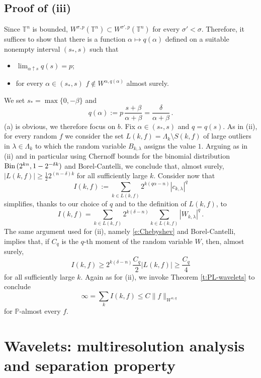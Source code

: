 \documentclass[11pt,reqno]{amsart}
\theoremstyle{definition}
\numberwithin{equation}{section}
\begin{document}
\subsection{Proof of (iii)} Since $\mathbb T^n$ is bounded, $W^{\sigma, p} (\mathbb T^n) \subset W^{\sigma', p} (\mathbb T^n)$ for every $\sigma'< \sigma$. Therefore, it suffices to show that there is a function $\alpha\mapsto q(\alpha)$ defined on a suitable nonempty interval $(s_*,s)$ such that 
\begin{itemize}
\item[(a)] $\lim_{\alpha \uparrow s} q(s) = p$;
\item[(b)] for every $\alpha \in (s_*,s)$ $f\not\in W^{\alpha, q(\alpha)}$ almost surely.
\end{itemize}
We set $s_* = \max \{0, -\beta\}$ and 
\begin{equation}\label{e:choice-of-q}
q(\alpha) := p \, \frac{s + \beta}{\alpha + \beta} = \frac{\delta}{\alpha + \beta}\, .
\end{equation}
(a) is obvious, we therefore focus on $b$. Fix $\alpha\in (s_*,s)$ and $q=q(s)$. As in (ii), for every random $f$ we consider the set $L(k, f)= \Lambda_k\setminus S(k,f)$ of large outliers in $\lambda \in \Lambda_k$ to which the random variable $B_{k, \lambda}$ assigns the value $1$. Arguing as in (ii) and in particular using Chernoff bounds for the binomial distribution ${\rm Bin}\, (2^{kn}, 1- 2^{-\delta k})$ and Borel-Cantelli, we conclude that, almost surely, $|L (k, f)|\geq \frac{1}{2} 2^{(n-\delta) k}$ for all sufficiently large $k$. Consider now that 
\[
I (k, f) := \sum_{k\in L (k,f)} 2^{k(q\alpha-n)} |c_{k, \lambda}|^q 
\]
simplifies, thanks to our choice of $q$ and to the definition of $L(k,f)$, to
\[
I (k,f) = \sum_{k\in L (k,f)} 2^{k(\delta -n)} \sum_{k\in L (k,f)} |W_{k, \lambda}|^q\, .
\]
The same argument used for (ii), namely \eqref{e:Chebyshev} and Borel-Cantelli, implies that, if $C_q$ is the $q$-th moment of the random variable $W$, then, almost surely,  
\[
I (k,f) \geq 2^{k(\delta-n)} \frac{C_q}{2} |L (k,f)| \geq \frac{C_q}{4} 
\]
for all sufficiently large $k$. Again as for (ii), we invoke Theorem \ref{t:PL-wavelets} to conclude 
\[
\infty = \sum_k I (k,f) \leq C \|f\|_{W^{\alpha, q}}\, 
\] 
for $\mathbb P$-almost every $f$.



\section{Wavelets: multiresolution analysis and separation property}\label{a:multi-resolution}
\end{document}
